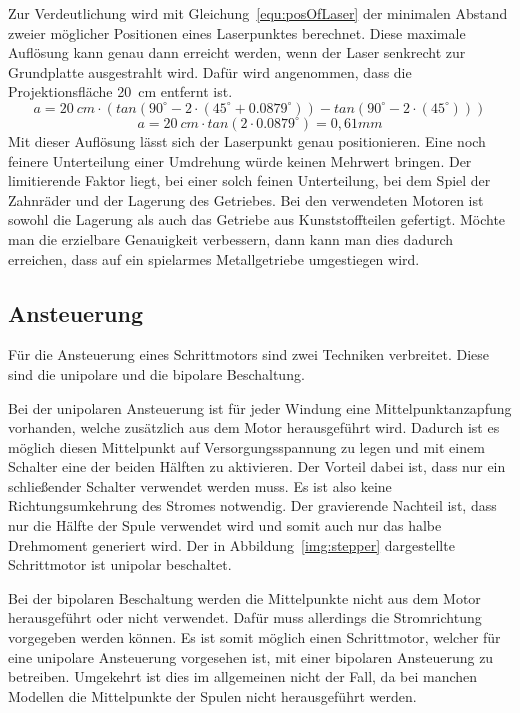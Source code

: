 Zur Verdeutlichung wird mit Gleichung~\ref{equ:posOfLaser} der minimalen Abstand zweier möglicher Positionen eines Laserpunktes berechnet.
Diese maximale Auflösung kann genau dann erreicht werden, wenn der Laser senkrecht zur Grundplatte ausgestrahlt wird.
Dafür wird angenommen, dass die Projektionsfläche 20~cm entfernt ist.
\begin{equation}
a=20~cm \cdot ( tan(90^\circ-2 \cdot (45^\circ + 0.0879^\circ)) - tan(90^\circ-2 \cdot (45^\circ)))
\end{equation}
\begin{equation}
a=20~cm \cdot tan(2 \cdot 0.0879^\circ) = 0,61mm
\end{equation}
Mit dieser Auflösung lässt sich der Laserpunkt genau positionieren.
Eine noch feinere Unterteilung einer Umdrehung würde keinen Mehrwert bringen.
Der limitierende Faktor liegt, bei einer solch feinen Unterteilung, bei dem Spiel der Zahnräder und der Lagerung des Getriebes.
Bei den verwendeten Motoren ist sowohl die Lagerung als auch das Getriebe aus Kunststoffteilen gefertigt.
Möchte man die erzielbare Genauigkeit verbessern, dann kann man dies dadurch erreichen, dass auf ein spielarmes Metallgetriebe umgestiegen wird.


\subsection{Ansteuerung}
Für die Ansteuerung eines Schrittmotors sind zwei Techniken verbreitet.
Diese sind die unipolare und die bipolare Beschaltung.

Bei der unipolaren Ansteuerung ist für jeder Windung eine Mittelpunktanzapfung vorhanden, welche zusätzlich aus dem Motor herausgeführt wird.
Dadurch ist es möglich diesen Mittelpunkt auf Versorgungsspannung zu legen und mit einem Schalter eine der beiden Hälften zu aktivieren.
Der Vorteil dabei ist, dass nur ein schließender Schalter verwendet werden muss.
Es ist also keine Richtungsumkehrung des Stromes notwendig.
Der gravierende Nachteil ist, dass nur die Hälfte der Spule verwendet wird und somit auch nur das halbe Drehmoment generiert wird.
Der in Abbildung~\ref{img:stepper} dargestellte Schrittmotor ist unipolar beschaltet.

Bei der bipolaren Beschaltung werden die Mittelpunkte nicht aus dem Motor herausgeführt oder nicht verwendet.
Dafür muss allerdings die Stromrichtung vorgegeben werden können.
Es ist somit möglich einen Schrittmotor, welcher für eine unipolare Ansteuerung vorgesehen ist, mit einer bipolaren Ansteuerung zu betreiben.
Umgekehrt ist dies im allgemeinen nicht der Fall, da bei manchen Modellen die Mittelpunkte der Spulen nicht herausgeführt werden.

